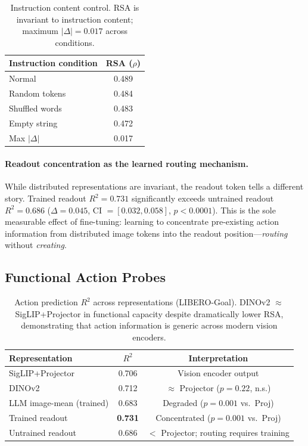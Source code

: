 \documentclass[letterpaper]{article}
\begin{document}
\begin{table}[t]
\centering
\caption{Instruction content control. RSA is invariant to instruction content; maximum $|\Delta|{=}0.017$ across conditions.}
\label{tab:instruction-control}
\begin{tabular}{lc}
\toprule
\textbf{Instruction condition} & \textbf{RSA ($\rho$)} \\
\midrule
Normal & 0.489 \\
Random tokens & 0.484 \\
Shuffled words & 0.483 \\
Empty string & 0.472 \\
\midrule
Max $|\Delta|$ & 0.017 \\
\bottomrule
\end{tabular}
\end{table}

\paragraph{Readout concentration as the learned routing mechanism.}
While distributed representations are invariant, the readout token tells a different story. Trained readout $R^2{=}0.731$ significantly exceeds untrained readout $R^2{=}0.686$ ($\Delta{=}0.045$, CI $= [0.032, 0.058]$, $p{<}0.0001$). This is the sole measurable effect of fine-tuning: learning to concentrate pre-existing action information from distributed image tokens into the readout position---\emph{routing} without \emph{creating}.

\subsection{Functional Action Probes}
\label{sec:exp-functional}

\begin{table}[t]
\centering
\caption{Action prediction $R^2$ across representations (LIBERO-Goal). DINOv2 $\approx$ SigLIP+Projector in functional capacity despite dramatically lower RSA, demonstrating that action information is generic across modern vision encoders.}
\label{tab:functional-probes}
\begin{tabular}{lcc}
\toprule
\textbf{Representation} & \textbf{$R^2$} & \textbf{Interpretation} \\
\midrule
SigLIP+Projector & 0.706 & Vision encoder output \\
DINOv2 & 0.712 & $\approx$ Projector ($p{=}0.22$, n.s.) \\
LLM image-mean (trained) & 0.683 & Degraded ($p{=}0.001$ vs.\ Proj) \\
Trained readout & \textbf{0.731} & Concentrated ($p{=}0.001$ vs.\ Proj) \\
Untrained readout & 0.686 & $<$ Projector; routing requires training \\
\bottomrule
\end{tabular}
\end{table}
\end{document}
